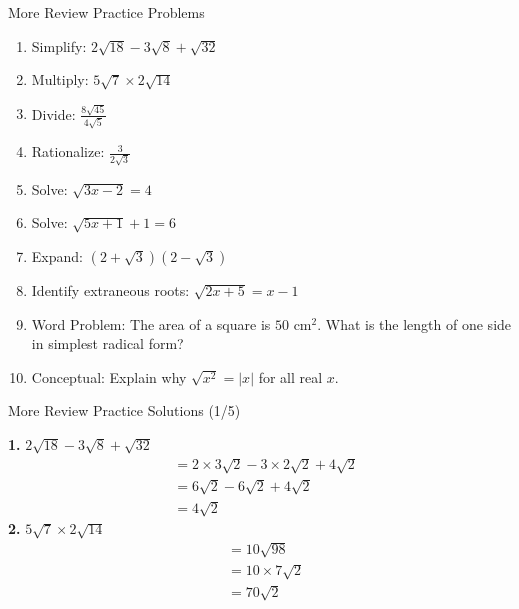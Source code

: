 \documentclass[aspectratio=169]{beamer}
\begin{document}

\begin{frame}{More Review Practice Problems}
\begin{tcolorbox}[colback=lightgray,colframe=accent,title=More Practice Problems]
\footnotesize
\begin{enumerate}
  \item Simplify: $2\sqrt{18} - 3\sqrt{8} + \sqrt{32}$
  \item Multiply: $5\sqrt{7} \times 2\sqrt{14}$
  \item Divide: $\frac{8\sqrt{45}}{4\sqrt{5}}$
  \item Rationalize: $\frac{3}{2\sqrt{3}}$
  \item Solve: $\sqrt{3x-2} = 4$
  \item Solve: $\sqrt{5x+1} + 1 = 6$
  \item Expand: $(2+\sqrt{3})(2-\sqrt{3})$
  \item Identify extraneous roots: $\sqrt{2x+5} = x-1$
  \item Word Problem: The area of a square is $50$ cm$^2$. What is the length of one side in simplest radical form?
  \item Conceptual: Explain why $\sqrt{x^2} = |x|$ for all real $x$.
\end{enumerate}
\end{tcolorbox}
\end{frame}


\begin{frame}{More Review Practice Solutions (1/5)}
\begin{tcolorbox}[colback=lightgray,colframe=primary,title=Solutions]
\footnotesize
\textbf{1.} $2\sqrt{18} - 3\sqrt{8} + \sqrt{32}$
\begin{align*}
  &= 2 \times 3\sqrt{2} - 3 \times 2\sqrt{2} + 4\sqrt{2} \\
  &= 6\sqrt{2} - 6\sqrt{2} + 4\sqrt{2} \\
  &= 4\sqrt{2}
\end{align*}
\vspace{0.5em}
\textbf{2.} $5\sqrt{7} \times 2\sqrt{14}$
\begin{align*}
  &= 10\sqrt{98} \\
  &= 10 \times 7\sqrt{2} \\
  &= 70\sqrt{2}
\end{align*}
\end{tcolorbox}
\end{frame}
\end{document}
